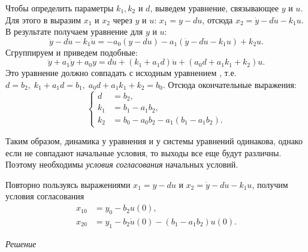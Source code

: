 \documentclass[../../TAU.tex]{subfiles}
\begin{document}
    Чтобы определить параметры $k_1,k_2$ и $d$, выведем уравнение, связывающее $y$ и $u$. Для этого в  выразим $x_1$ и $x_2$ через $y$ и $u$:
    $x_1 = y - du$, 
    отсюда 
    $x_2 = \dot y - d\dot u -k_1 u$. 
    В результате получаем уравнение для $y$ и $u$:
    $$
        \ddot y - d \ddot u -k_1\dot u = -a_0 (y-du)-a_1(\dot y - d \dot u - k_1 u)+k_2u.
    $$
    Сгруппируем и приведем подобные:
    $$
        \ddot y +a_1\dot y + a_0 y = d\ddot u + (k_1+a_1d)\dot u + (a_0 d + a_1k_1+k_2)u.
    $$
    Это уравнение должно совпадать с исходным уравнением , т.е.
    $d = b_2,\; k_1 + a_1d = b_1,\; a_0 d+a_1k_1+k_2 = b_0$. 
    Отсюда окончательные выражения:
    $$
        \left\{
        \begin{aligned}
            d&=b_2,\\
            k_1 &= b_1 - a_1b_2,\\
            k_2 &= b_0 - a_0 b_2 - a_1 (b_1-a_1b_2).
        \end{aligned}
        \right.
    $$

    Таким образом, динамика у уравнения  и у системы уравнений  одинакова, однако если не совпадают начальные условия, то выходы все еще будут различны. Поэтому необходимы {\it условия согласования} начальных условий.

    Повторно пользуясь выражениями 
    $x_1 = y - du$ 
    и 
    $x_2 = \dot y - d\dot u -k_1 u$, 
    получим условия согласования
    $$
        \begin{aligned}
            x_{10} &= y_0- b_2 u(0),\\
            x_{20} &= y_1-b_2\dot u (0) - (b_1-a_1b_2)u(0).
        \end{aligned}
    $$

    \textit{Решение}
    
\end{document}
